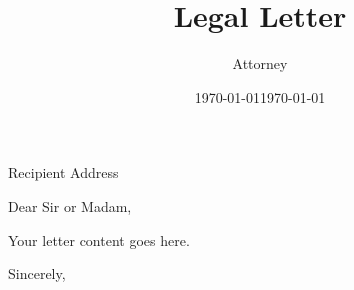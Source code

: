 \documentclass{letter}
\title{Legal Letter}
\author{Attorney}
\date{\today}
\begin{document}
\maketitle

\address{Your Address}
\date{\today}

\begin{letter}{Recipient Address}
\opening{Dear Sir or Madam,}

Your letter content goes here.

\closing{Sincerely,}
\end{letter}
\end{document}
